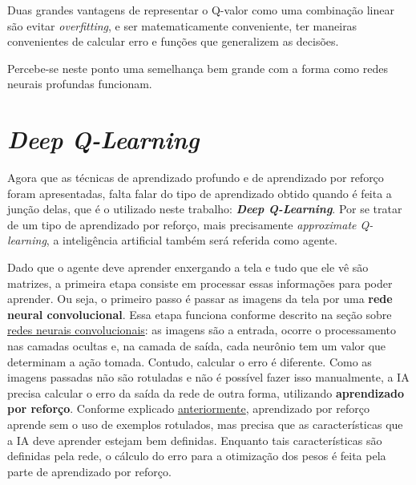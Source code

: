 Duas grandes vantagens de representar o Q-valor como uma combinação linear são evitar \textit{overfitting}, e ser matematicamente conveniente, ter maneiras convenientes de calcular erro e funções que generalizem as decisões.

Percebe-se neste ponto uma semelhança bem grande com a forma como redes neurais profundas funcionam.


\section{\textit{Deep Q-Learning}}
\label{sec:dql}

Agora que as técnicas de aprendizado profundo e de aprendizado por reforço foram apresentadas, falta falar do tipo de aprendizado obtido quando é feita a junção delas, que é o utilizado neste trabalho: \textit{\textbf{Deep Q-Learning}}.
Por se tratar de um tipo de aprendizado por reforço, mais precisamente \textit{approximate Q-learning}, a inteligência artificial também será referida como agente.

Dado que o agente deve aprender enxergando a tela e tudo que ele vê são matrizes, a primeira etapa consiste em processar essas informações para poder aprender.
Ou seja, o primeiro passo é passar as imagens da tela por uma \textbf{rede neural convolucional}.
Essa etapa funciona conforme descrito na seção sobre \hyperref[sec:cnn]{redes neurais convolucionais}: as imagens são a entrada, ocorre o processamento nas camadas ocultas e, na camada de saída, cada neurônio tem um valor que determinam a ação tomada.
Contudo, calcular o erro é diferente.
Como as imagens passadas não são rotuladas e não é possível fazer isso manualmente, a IA precisa calcular o erro da saída da rede de outra forma, utilizando \textbf{aprendizado por reforço}.
Conforme explicado \hyperref[sec:rl]{anteriormente}, aprendizado por reforço aprende sem o uso de exemplos rotulados, mas precisa que as características que a IA deve aprender estejam bem definidas.
Enquanto tais características são definidas pela rede, o cálculo do erro para a otimização dos pesos é feita pela parte de aprendizado por reforço.

